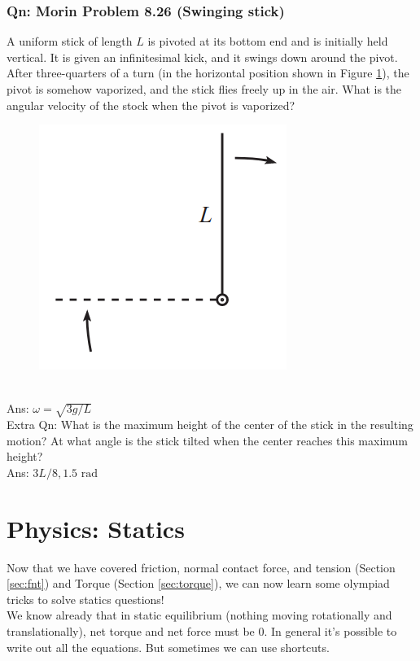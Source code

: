 \documentclass{article}
\begin{document}
\subsubsection{Qn: Morin Problem 8.26 (Swinging stick)}
A uniform stick of length $L$ is pivoted at its bottom end and is initially held vertical. It is given an infinitesimal kick, and it swings down around the pivot. After three-quarters of a turn (in the horizontal position shown in Figure \ref{fig:morin8.26}), the pivot is somehow vaporized, and the stick flies freely up in the air. What is the angular velocity of the stock when the pivot is vaporized? 
\begin{figure} 
\includegraphics[width=\linewidth]{images/morin8.26.png}
\label{fig:morin8.26}
\end{figure}\\
Ans: $\omega = \sqrt{3g/L}$\\[5pt]
Extra Qn: What is the maximum height of the center of the stick in the resulting motion? At what angle is the stick tilted when the center reaches this maximum height? \\[5pt]
Ans: $3L/8, 1.5\text{ rad}$
\newpage\clearpage 
\section{Physics: Statics}
Now that we have covered friction, normal contact force, and tension (Section \ref{sec:fnt}) and Torque (Section \ref{sec:torque}), we can now learn some olympiad tricks to solve statics questions!\\[10pt]
We know already that in static equilibrium (nothing moving rotationally and translationally), net torque and net force must be 0. In general it's possible to write out all the equations. But sometimes we can use shortcuts.
\end{document}
